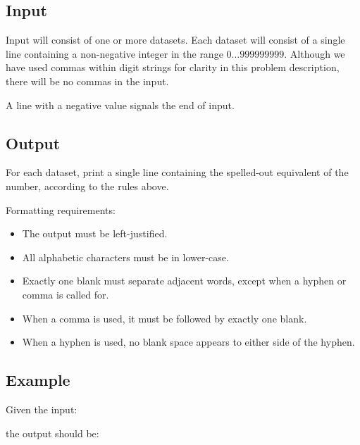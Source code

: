 \subsection*{Input}

Input will consist of one or more datasets. Each dataset will consist
of a single line containing a non-negative integer in the range
$0\ldots \num{999999999}$. Although we have used commas within digit
strings for clarity in this problem description, there will be no
commas in the input.

A line with a negative value signals the end of input.

\subsection*{Output}

For each dataset, print a single line containing the spelled-out
equivalent of the number, according to the rules above.

Formatting requirements:
\begin{itemize}
\item The output must be left-justified.
\item All alphabetic characters must be in lower-case.
\item Exactly one blank must separate adjacent words, except when a
  hyphen or comma is called for.
\item When a comma is used, it must be followed by exactly one blank.
\item When a hyphen is used, no blank space appears to either side of
  the hyphen.
\end{itemize}


\subsection*{Example}

Given the input:



the output should be:




